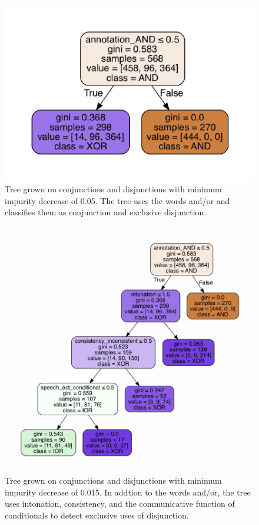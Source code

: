 \documentclass[oneside]{report}
\theoremstyle{definition}
\theoremstyle{definition}
\theoremstyle{definition}
\theoremstyle{remark}
\begin{document}
\begin{figure}
\centering
\includegraphics{figs/ternaryNoFeatures-1.pdf}
\caption{\label{fig:ternaryNoFeatures}Tree grown on conjunctions and
disjunctions with minimum impurity decrease of 0.05. The tree uses the
words and/or and classifies them as conjunction and exclusive
disjunction.}
\end{figure}
\begin{figure}
\centering
\includegraphics{figs/ternaryLowFeatures-1.pdf}
\caption{\label{fig:ternaryLowFeatures}Tree grown on conjunctions and
disjunctions with minimum impurity decrease of 0.015. In addtion to the
words and/or, the tree uses intonation, consistency, and the
communicative function of conditionals to detect exclusive uses of
disjunction.}
\end{figure}
\end{document}
